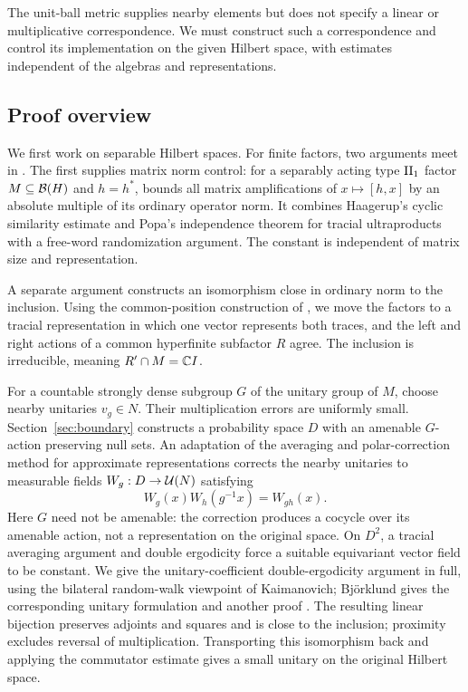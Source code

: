 The unit-ball metric supplies nearby elements but does not specify a
linear or multiplicative correspondence. We must construct such a
correspondence and control its implementation on the given Hilbert space,
with estimates independent of the algebras and representations.

\subsection{Proof overview}

We first work on separable Hilbert spaces. For finite factors, two
arguments meet in . The first supplies matrix norm
control: for a separably acting type $\mathrm{II}_1$ factor $M\subseteq\mathcal B(H)$
and $h=h^*$,  bounds all matrix amplifications
of $x\mapsto[h,x]$ by an absolute multiple of its ordinary operator
norm. It combines Haagerup's cyclic similarity estimate
\cite{Haagerup1983} and Popa's independence theorem for tracial
ultraproducts \cite{Popa2014} with a free-word randomization argument.
The constant is independent of matrix size and representation.

A separate argument constructs an isomorphism close in ordinary norm
to the inclusion. Using the common-position construction of
\cite[Lemma~4.10]{CCSSWW2014}, we move the factors to a tracial
representation in which one vector represents both traces, and the
left and right actions of a common hyperfinite subfactor $R$ agree.
The inclusion is irreducible, meaning $R'\cap M=\mathbb C I$.

For a countable strongly dense subgroup $G$ of the unitary group of $M$,
choose nearby unitaries $v_g\in N$. Their multiplication errors are
uniformly small. Section~\ref{sec:boundary} constructs a probability
space $D$ with an amenable $G$-action preserving null sets. An adaptation
of the averaging and polar-correction method for approximate
representations \cite{Kazhdan1982,BurgerOzawaThom2013} corrects the
nearby unitaries to measurable fields $W_g:D\to\mathcal U(N)$ satisfying
\[
 W_g(x)W_h(g^{-1}x)=W_{gh}(x).
\]
Here $G$ need not be amenable: the correction produces a cocycle over
its amenable action, not a representation on the original space.
On $D^2$, a tracial averaging argument and double ergodicity force a
suitable equivariant vector field to be constant. We give the
unitary-coefficient double-ergodicity argument in full, using the
bilateral random-walk viewpoint of Kaimanovich; Bj\"orklund gives
the corresponding unitary formulation and another proof
\cite{Kaimanovich2003,Bjorklund2014}. The resulting linear bijection preserves
adjoints and squares and is close to the inclusion; proximity excludes
reversal of multiplication. Transporting this isomorphism back and
applying the commutator estimate gives a small unitary on the original
Hilbert space.


